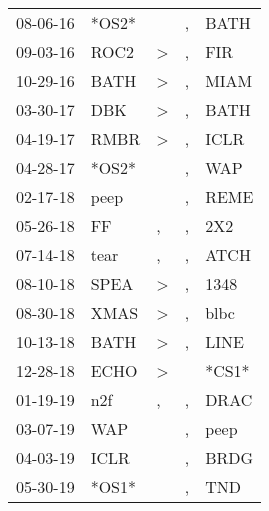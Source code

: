 \begin{supertabular}{p{0.07\textwidth}p{0.06\textwidth}p{0.02\textwidth}p{0.02\textwidth}p{0.06\textwidth}}
 08-06-16\textsuperscript{} &                   *OS2* &                  &             , &  BATH\textsuperscript{} \\
 09-03-16\textsuperscript{} &  ROC2\textsuperscript{} &     \textgreater &             , &   FIR\textsuperscript{} \\
 10-29-16\textsuperscript{} &  BATH\textsuperscript{} &     \textgreater &             , &  MIAM\textsuperscript{} \\
 03-30-17\textsuperscript{} &   DBK\textsuperscript{} &     \textgreater &             , &  BATH\textsuperscript{} \\
 04-19-17\textsuperscript{} &  RMBR\textsuperscript{} &     \textgreater &             , &  ICLR\textsuperscript{} \\
 04-28-17\textsuperscript{} &                   *OS2* &                  &             , &   WAP\textsuperscript{} \\
 02-17-18\textsuperscript{} &  peep\textsuperscript{} &                  &             , &  REME\textsuperscript{} \\
 05-26-18\textsuperscript{} &    FF\textsuperscript{} &                , &             , &   2X2\textsuperscript{} \\
 07-14-18\textsuperscript{} &  tear\textsuperscript{} &                , &             , &  ATCH\textsuperscript{} \\
 08-10-18\textsuperscript{} &  SPEA\textsuperscript{} &     \textgreater &             , &  1348\textsuperscript{} \\
 08-30-18\textsuperscript{} &  XMAS\textsuperscript{} &     \textgreater &             , &  blbc\textsuperscript{} \\
 10-13-18\textsuperscript{} &  BATH\textsuperscript{} &     \textgreater &             , &  LINE\textsuperscript{} \\
 12-28-18\textsuperscript{} &  ECHO\textsuperscript{} &     \textgreater &               &                   *CS1* \\
 01-19-19\textsuperscript{} &   n2f\textsuperscript{} &                , &             , &  DRAC\textsuperscript{} \\
 03-07-19\textsuperscript{} &   WAP\textsuperscript{} &                  &             , &  peep\textsuperscript{} \\
 04-03-19\textsuperscript{} &  ICLR\textsuperscript{} &                  &             , &  BRDG\textsuperscript{} \\
 05-30-19\textsuperscript{} &                   *OS1* &                  &             , &   TND\textsuperscript{} \\

\end{supertabular}
